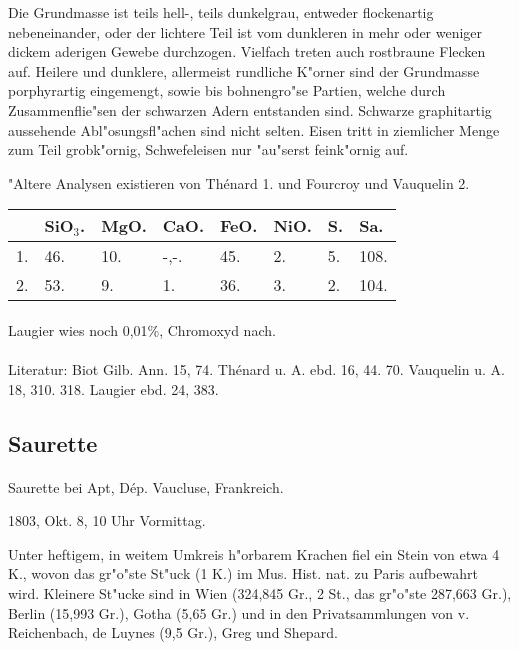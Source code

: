 \documentclass[a4paper, 11pt, oneside]{article}
\begin{document}
Die Grundmasse ist teils hell-, teils dunkelgrau, entweder flockenartig nebeneinander, oder der lichtere Teil ist vom dunkleren in mehr oder weniger dickem aderigen Gewebe durchzogen. Vielfach treten auch rostbraune Flecken auf. Heilere und dunklere, allermeist rundliche K"orner sind der Grundmasse porphyrartig eingemengt, sowie bis bohnengro"se Partien, welche durch Zusammenflie"sen der schwarzen Adern entstanden sind. Schwarze graphitartig aussehende Abl"osungsfl"achen sind nicht selten. Eisen tritt in ziemlicher Menge zum Teil grobk"ornig, Schwefeleisen nur "au"serst feink"ornig auf.

"Altere Analysen existieren von Thénard 1. und Fourcroy und Vauquelin 2.
\begin{table}[!ht]
    \centering
    \begin{tabular}{l l l l l l l l}
         & SiO$_{3}$. & MgO. & CaO. & FeO. & NiO. & S. & Sa. \\ \hline
        1. & 46. & 10. & -,-. & 45. & 2. & 5. & 108. \\
        2. & 53. & 9. & 1. & 36. & 3. & 2. & 104. \\
    \end{tabular}
\end{table}
\paragraph{}
Laugier wies noch 0,01\%, Chromoxyd nach.
\footnotesize
\paragraph{}
Literatur: Biot Gilb. Ann. 15, 74. Thénard u. A. ebd. 16, 44. 70. Vauquelin u. A. 18, 310. 318. Laugier ebd. 24, 383.
\subsection{Saurette}
\normalsize
\paragraph{}
Saurette bei Apt, Dép. Vaucluse, Frankreich.

1803, Okt. 8, 10 Uhr Vormittag.

Unter heftigem, in weitem Umkreis h"orbarem Krachen fiel ein Stein von etwa 4 K., wovon das gr"o"ste St"uck (1 K.) im Mus. Hist. nat. zu Paris aufbewahrt wird. Kleinere St"ucke sind in Wien (324,845 Gr., 2 St., das gr"o"ste 287,663 Gr.), Berlin (15,993 Gr.), Gotha (5,65 Gr.) und in den Privatsammlungen von v. Reichenbach, de Luynes (9,5 Gr.), Greg und Shepard.
\end{document}
